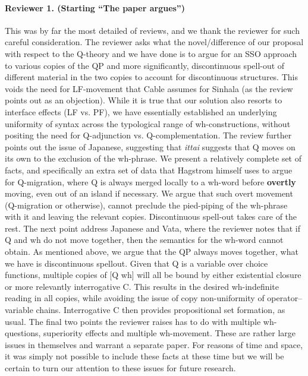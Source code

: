 \documentclass[11pt]{article}
\begin{document}
\paragraph{Reviewer 1.  (Starting ``The paper argues'')} This was by far the most detailed of reviews, and we thank the reviewer for such careful consideration. The reviewer asks what the novel/difference of our proposal with respect to the Q-theory and we have done is to argue for an SSO approach to various copies of the QP and more significantly, discontinuous spell-out of different material in the two copies to account for discontinuous structures. This voids the need for LF-movement that Cable assumes for Sinhala (as the review points out as an objection). While it is true that our solution also resorts to interface effects (LF vs. PF), we have essentially established an underlying uniformity of syntax across the typological range of wh-constructions, without positing the need for Q-adjunction vs. Q-complementation. The review further points out the issue of Japanese, suggesting that \textit{ittai} suggests that Q moves on its own to the exclusion of the wh-phrase. We present a relatively complete set of facts, and specifically an extra set of data that Hagstrom himself uses to argue for Q-migration, where Q is always merged locally to a wh-word before \textbf{overtly} moving, even out of an island if necessary. We argue that such overt movement (Q-migration or otherwise), cannot preclude the pied-piping of the wh-phrase with it and leaving the relevant copies. Discontinuous spell-out takes care of the rest. The next point address Japanese and Vata, where the reviewer notes that if Q and wh do not move together, then the semantics for the wh-word cannot obtain. As mentioned above, we argue that the QP always moves together, what we have is discontinuous spellout. Given that Q is a variable over choice functions, multiple copies of [Q wh] will all be bound by either existential closure or more relevantly interrogative C. This results in the desired wh-indefinite reading in all copies, while avoiding the issue of copy non-uniformity of operator--variable chains. Interrogative C then provides propositional set formation, as usual. The final two points the reviewer raises has to do with multiple wh-questions, superiority effects and multiple wh-movement. These are rather large issues in themselves and warrant a separate paper. For reasons of time and space, it was simply not possible to include these facts at these time but we will be certain to turn our attention to these issues for future research.
\end{document}
